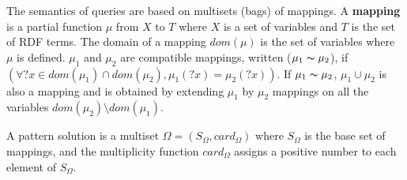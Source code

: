 
The semantics of \sparql queries are based on multisets (bags) of mappings. A \textbf{mapping} is a partial function $\mu$ from $X$ to $T$ where $X$ is a set of variables and $T$ is the set of RDF terms. 
The domain of a mapping $dom(\mu)$ is the set of variables where $\mu$ is defined. $\mu_1$ and $\mu_2$ are compatible mappings, written ($\mu_1 \thicksim \mu_2$), if  $(\forall ?x \in dom(\mu_1) \cap dom(\mu_2), \mu_1(?x) = \mu_2(?x))$.
If $\mu_1 \thicksim \mu_2$, $\mu_1 \cup \mu_2$ is also a mapping and is obtained by extending $\mu_1$ by $\mu_2$ mappings on all the variables $dom(\mu_2) \setminus dom(\mu_1)$. %

A \sparql pattern solution is a multiset $\Omega = (S_{\Omega}, card_{\Omega})$ where $S_{\Omega}$ is the base set of mappings, and the multiplicity function $card_{\Omega}$ assigns a positive number to each element of $S_{\Omega}$.

